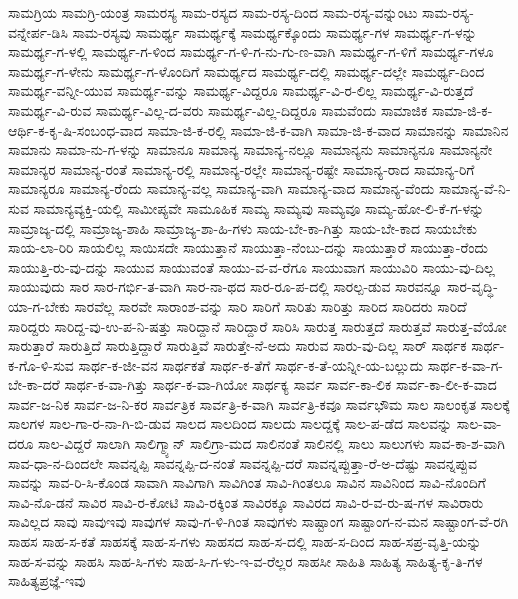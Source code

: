 {ಸಾಮಗ್ರಿಯ
ಸಾಮಗ್ರಿ-ಯಂತ್ರ
ಸಾಮರಸ್ಯ
ಸಾಮ-ರಸ್ಯದ
ಸಾಮ-ರಸ್ಯ-ದಿಂದ
ಸಾಮ-ರಸ್ಯ-ವನ್ನುಂಟು
ಸಾಮ-ರಸ್ಯ-ವನ್ನೇರ್ಪ-ಡಿಸಿ
ಸಾಮ-ರಸ್ಯವು
ಸಾಮರ್ಥ್ಯ
ಸಾಮರ್ಥ್ಯಕ್ಕೆ
ಸಾಮರ್ಥ್ಯಕ್ಕೊಂದು
ಸಾಮರ್ಥ್ಯ-ಗಳ
ಸಾಮರ್ಥ್ಯ-ಗ-ಳನ್ನು
ಸಾಮರ್ಥ್ಯ-ಗ-ಳಲ್ಲಿ
ಸಾಮರ್ಥ್ಯ-ಗ-ಳಿಂದ
ಸಾಮರ್ಥ್ಯ-ಗ-ಳಿ-ಗ-ನು-ಗು-ಣ-ವಾಗಿ
ಸಾಮರ್ಥ್ಯ-ಗ-ಳಿಗೆ
ಸಾಮರ್ಥ್ಯ-ಗಳೂ
ಸಾಮರ್ಥ್ಯ-ಗ-ಳೇನು
ಸಾಮರ್ಥ್ಯ-ಗ-ಳೊಂದಿಗೆ
ಸಾಮರ್ಥ್ಯದ
ಸಾಮರ್ಥ್ಯ-ದಲ್ಲಿ
ಸಾಮರ್ಥ್ಯ-ದಲ್ಲೇ
ಸಾಮರ್ಥ್ಯ-ದಿಂದ
ಸಾಮರ್ಥ್ಯ-ವನ್ನೀ-ಯುವ
ಸಾಮರ್ಥ್ಯ-ವನ್ನು
ಸಾಮರ್ಥ್ಯ-ವಿದ್ದರೂ
ಸಾಮರ್ಥ್ಯ-ವಿ-ರ-ಲಿಲ್ಲ
ಸಾಮರ್ಥ್ಯ-ವಿ-ರುತ್ತದೆ
ಸಾಮರ್ಥ್ಯ-ವಿ-ರುವ
ಸಾಮರ್ಥ್ಯ-ವಿಲ್ಲ-ದ-ವರು
ಸಾಮರ್ಥ್ಯ-ವಿಲ್ಲ-ದಿದ್ದರೂ
ಸಾಮವೆಂದು
ಸಾಮಾಜಿಕ
ಸಾಮಾ-ಜಿ-ಕ-ಆರ್ಥಿ-ಕ-ಕೃ-ಷಿ-ಸಂಬಂಧ-ವಾದ
ಸಾಮಾ-ಜಿ-ಕ-ರಲ್ಲಿ
ಸಾಮಾ-ಜಿ-ಕ-ವಾಗಿ
ಸಾಮಾ-ಜಿ-ಕ-ವಾದ
ಸಾಮಾನನ್ನು
ಸಾಮಾನಿನ
ಸಾಮಾನು
ಸಾಮಾ-ನು-ಗ-ಳನ್ನು
ಸಾಮಾನೂ
ಸಾಮಾನ್ಯ
ಸಾಮಾನ್ಯ-ನಲ್ಲೂ
ಸಾಮಾನ್ಯನು
ಸಾಮಾನ್ಯನೂ
ಸಾಮಾನ್ಯನೇ
ಸಾಮಾನ್ಯರ
ಸಾಮಾನ್ಯ-ರಂತೆ
ಸಾಮಾನ್ಯ-ರಲ್ಲಿ
ಸಾಮಾನ್ಯ-ರಲ್ಲೇ
ಸಾಮಾನ್ಯ-ರಷ್ಟೇ
ಸಾಮಾನ್ಯ-ರಾದ
ಸಾಮಾನ್ಯ-ರಿಗೆ
ಸಾಮಾನ್ಯರೂ
ಸಾಮಾನ್ಯ-ರೆಂದು
ಸಾಮಾನ್ಯ-ವಲ್ಲ
ಸಾಮಾನ್ಯ-ವಾಗಿ
ಸಾಮಾನ್ಯ-ವಾದ
ಸಾಮಾನ್ಯ-ವೆಂದು
ಸಾಮಾನ್ಯ-ವೆ-ನಿ-ಸುವ
ಸಾಮಾನ್ಯವ್ಯಕ್ತಿ-ಯಲ್ಲಿ
ಸಾಮೀಪ್ಯವೇ
ಸಾಮೂಹಿಕ
ಸಾಮ್ಯ
ಸಾಮ್ಯವು
ಸಾಮ್ಯವೂ
ಸಾಮ್ಯ-ಹೋ-ಲಿ-ಕೆ-ಗ-ಳನ್ನು
ಸಾಮ್ರಾಜ್ಯ-ದಲ್ಲಿ
ಸಾಮ್ರಾಜ್ಯ-ಶಾಹಿ
ಸಾಮ್ರಾಜ್ಯ-ಶಾ-ಹಿ-ಗಳು
ಸಾಯ-ಬೇ-ಕಾ-ಗಿತ್ತು
ಸಾಯ-ಬೇ-ಕಾದ
ಸಾಯಬೇಕು
ಸಾಯ-ಲಾ-ರಿರಿ
ಸಾಯಲಿಲ್ಲ
ಸಾಯಿಸದೇ
ಸಾಯುತ್ತಾನೆ
ಸಾಯುತ್ತಾ-ನೆಂಬು-ದನ್ನು
ಸಾಯುತ್ತಾರೆ
ಸಾಯುತ್ತಾ-ರೆಂದು
ಸಾಯುತ್ತಿ-ರು-ವು-ದನ್ನು
ಸಾಯುವ
ಸಾಯುವಂತೆ
ಸಾಯು-ವ-ವ-ರೆಗೂ
ಸಾಯುವಾಗ
ಸಾಯುವಿರಿ
ಸಾಯು-ವು-ದಿಲ್ಲ
ಸಾಯುವುದು
ಸಾರ
ಸಾರ-ಗರ್ಭಿ-ತ-ವಾಗಿ
ಸಾರ-ನಾ-ಥದ
ಸಾರ-ರೂ-ಪ-ದಲ್ಲಿ
ಸಾರಲ್ಪ-ಡುವ
ಸಾರವನ್ನೂ
ಸಾರ-ವೃದ್ಧಿ-ಯಾ-ಗ-ಬೇಕು
ಸಾರವೆಲ್ಲ
ಸಾರವೇ
ಸಾರಾಂಶ-ವನ್ನು
ಸಾರಿ
ಸಾರಿಗೆ
ಸಾರಿತು
ಸಾರಿತ್ತು
ಸಾರಿದ
ಸಾರಿದರು
ಸಾರಿದೆ
ಸಾರಿದ್ದರು
ಸಾರಿದ್ದ-ವು-ಉ-ಪ-ನಿ-ಷತ್ತು
ಸಾರಿದ್ದಾನೆ
ಸಾರಿದ್ದಾರೆ
ಸಾರಿಸಿ
ಸಾರುತ್ತ
ಸಾರುತ್ತದೆ
ಸಾರುತ್ತವೆ
ಸಾರುತ್ತ-ವೆಯೋ
ಸಾರುತ್ತಾರೆ
ಸಾರುತ್ತಿದೆ
ಸಾರುತ್ತಿದ್ದಾರೆ
ಸಾರುತ್ತಿವೆ
ಸಾರುತ್ತೇ-ನೆ-ಅದು
ಸಾರುವ
ಸಾರು-ವು-ದಿಲ್ಲ
ಸಾರ್
ಸಾರ್ಥಕ
ಸಾರ್ಥ-ಕ-ಗೊ-ಳಿ-ಸುವ
ಸಾರ್ಥ-ಕ-ಜೀ-ವನ
ಸಾರ್ಥಕತೆ
ಸಾರ್ಥ-ಕ-ತೆಗೆ
ಸಾರ್ಥ-ಕ-ತೆ-ಯನ್ನೀ-ಯ-ಬಲ್ಲುದು
ಸಾರ್ಥ-ಕ-ವಾ-ಗ-ಬೇ-ಕಾ-ದರೆ
ಸಾರ್ಥ-ಕ-ವಾ-ಗಿತ್ತು
ಸಾರ್ಥ-ಕ-ವಾ-ಗಿಯೋ
ಸಾರ್ಥಕ್ಯ
ಸಾರ್ವ
ಸಾರ್ವ-ಕಾ-ಲಿಕ
ಸಾರ್ವ-ಕಾ-ಲೀ-ಕ-ವಾದ
ಸಾರ್ವ-ಜ-ನಿಕ
ಸಾರ್ವ-ಜ-ನಿ-ಕರ
ಸಾರ್ವತ್ರಿಕ
ಸಾರ್ವತ್ರಿ-ಕ-ವಾಗಿ
ಸಾರ್ವತ್ರಿ-ಕವೂ
ಸಾರ್ವಭೌಮ
ಸಾಲ
ಸಾಲಂಕೃತ
ಸಾಲಕ್ಕೆ
ಸಾಲಗಳ
ಸಾಲ-ಗಾ-ರ-ನಾ-ಗಿ-ಬಿ-ಡುವ
ಸಾಲದ
ಸಾಲದಿಂದ
ಸಾಲದು
ಸಾಲದ್ದಕ್ಕೆ
ಸಾಲ-ಪ-ಡೆದ
ಸಾಲವನ್ನು
ಸಾಲ-ವಾ-ದರೂ
ಸಾಲ-ವಿದ್ದರೆ
ಸಾಲಾಗಿ
ಸಾಲಿಗ್ಮ್ಯಾನ್
ಸಾಲಿಗ್ರಾ-ಮದ
ಸಾಲಿನಂತೆ
ಸಾಲಿನಲ್ಲಿ
ಸಾಲು
ಸಾಲುಗಳು
ಸಾವ-ಕಾ-ಶ-ವಾಗಿ
ಸಾವ-ಧಾ-ನ-ದಿಂದಲೇ
ಸಾವನ್ನಪ್ಪಿ
ಸಾವನ್ನಪ್ಪಿ-ದ-ನಂತೆ
ಸಾವನ್ನಪ್ಪಿ-ದರೆ
ಸಾವನ್ನಪ್ಪುತ್ತಾ-ರೆ-ಅ-ದೆಷ್ಟು
ಸಾವನ್ನಪ್ಪುವ
ಸಾವನ್ನು
ಸಾವ-ರಿ-ಸಿ-ಕೊಂಡ
ಸಾವಾಗಿ
ಸಾವಿಗಾಗಿ
ಸಾವಿಗಿಂತ
ಸಾವಿ-ಗಿಂತಲೂ
ಸಾವಿನ
ಸಾವಿನಿಂದ
ಸಾವಿ-ನೊಂದಿಗೆ
ಸಾವಿ-ನೊ-ಡನೆ
ಸಾವಿರ
ಸಾವಿ-ರ-ಕೋಟಿ
ಸಾವಿ-ರಕ್ಕಿಂತ
ಸಾವಿರಕ್ಕೂ
ಸಾವಿರದ
ಸಾವಿ-ರ-ವ-ರು-ಷ-ಗಳ
ಸಾವಿರಾರು
ಸಾವಿಲ್ಲದ
ಸಾವು
ಸಾವುಇವು
ಸಾವುಗಳ
ಸಾವು-ಗ-ಳಿ-ಗಿಂತ
ಸಾವುಗಳು
ಸಾಷ್ಟಾಂಗ
ಸಾಷ್ಟಾಂಗ-ನ-ಮನ
ಸಾಷ್ಟಾಂಗ-ವೆ-ರಗಿ
ಸಾಹಸ
ಸಾಹ-ಸ-ಕತೆ
ಸಾಹಸಕ್ಕೆ
ಸಾಹ-ಸ-ಗಳು
ಸಾಹಸದ
ಸಾಹ-ಸ-ದಲ್ಲಿ
ಸಾಹ-ಸ-ದಿಂದ
ಸಾಹ-ಸಪ್ರ-ವೃತ್ತಿ-ಯನ್ನು
ಸಾಹ-ಸ-ವನ್ನು
ಸಾಹಸಿ
ಸಾಹ-ಸಿ-ಗಳು
ಸಾಹ-ಸಿ-ಗ-ಳು-ಇ-ವ-ರೆಲ್ಲರ
ಸಾಹಸೀ
ಸಾಹಿತಿ
ಸಾಹಿತ್ಯ
ಸಾಹಿತ್ಯ-ಕೃ-ತಿ-ಗಳ
ಸಾಹಿತ್ಯಪ್ರಜ್ಞೆ-ಇವು
}
